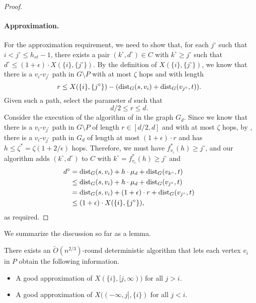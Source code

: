 \begin{proof}
\paragraph{Approximation.} For the approximation requirement, we need to show that, for each $j^\circ$ such that $i < j^\circ \leq h_{st}-1$, there exists a pair $(k^\circ,d^\circ) \in C$ with $k^\circ \geq j^\circ$ such that $d^\circ \leq (1+\epsilon) \cdot X(\{i\},\{j^\circ\})$. By the definition of $X(\{i\},\{j^\circ\})$, we know that there is a $v_i$-$v_{j^\circ}$ path in $G \setminus P$ with at most $\zeta$ hops and with length 
\[r \leq X(\{i\},\{j^\circ\}) - (\operatorname{dist}_G(s, v_i) + \operatorname{dist}_G(v_{j^\circ}, t)).\]
Given such a path, select the parameter $d$ such that 
\[d/2 \leq  r   \leq d.\] 
Consider the execution of the algorithm of  in the graph $G_d$. Since we know that there is a $v_i$-$v_{j^\circ}$ path in $G \setminus P$ of length $r \in [d/2, d]$ and with at most $\zeta$ hops, by , there is a $v_i$-$v_{j^\circ}$ path in $G_d$ of length at most $(1+\epsilon) \cdot r$ and has $h \leq \zeta^\ast = \zeta(1+2/\epsilon)$ hops. Therefore, we must have $f_{v_i}^\ast(h) \geq j^\circ$, and our algorithm adds $(k^\circ,d^\circ)$ to $C$ with $k^\circ = f_{v_i}^\ast(h) \geq j^\circ$ and
\begin{align*}
    d^\circ &= \operatorname{dist}_G(s, v_i) + h \cdot \mu_d + \operatorname{dist}_G(v_{k^\circ},t)\\
    &\leq \operatorname{dist}_G(s, v_i) + h \cdot \mu_d + \operatorname{dist}_G(v_{j^\circ},t)\\
    &= \operatorname{dist}_G(s, v_i) + (1+\epsilon) \cdot r + \operatorname{dist}_G(v_{j^\circ},t)\\
    &\leq (1+\epsilon)\cdot X(\{i\},\{j^\circ\}),
\end{align*}
as required. 
\end{proof}

We summarize the discussion so far as a lemma.

\begin{lemma}
\label{lem:rounding_summary}
There exists an $\widetilde{O}(n^{2/3})$-round deterministic algorithm that lets each vertex $v_i$ in $P$ obtain the following information.
\begin{itemize}
    \item A good approximation of $X(\{i\}, [j, \infty))$ for all $j > i$.
    \item A good approximation of $X((-\infty, j], \{i\})$ for all $j < i$.
\end{itemize}
\end{lemma}


